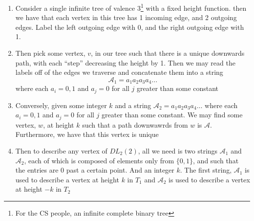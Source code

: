 \begin{enumerate}
    \item Consider a single infinite tree of valence 3\footnote{For the CS people, an infinite complete binary tree} with a fixed height function. then we have that each vertex in this tree has 1 incoming edge, and 2 outgoing edges. Label the left outgoing edge with 0, and the right outgoing edge with 1.
    \item Then pick some vertex, $v$, in our tree such that there is a unique downwards path, with each ``step'' decreasing the height by 1. Then we may read the labels off of the edges we traverse and concatenate them into a string
    \[\mathcal{A}_1 = a_1a_2a_3a_4\ldots\]
    where each $a_i=0,1$ and $a_j=0$ for all $j$ greater than some constant
    \item Conversely, given some integer $k$ and a string $\mathcal{A}_2=a_1a_2a_3a_4\ldots$ where each $a_i=0,1$ and $a_j=0$ for all $j$ greater than some constant. We may find some vertex, $w$, at height $k$ such that a path downwawrds from $w$ is $\mathcal{A}$. Furthermore, we have that this vertex is unique
    \item Then to describe any vertex of $DL_2(2)$, all we need is two strings $\mathcal{A}_1$ and $\mathcal{A}_2$, each of which is composed of elements only from $\{0,1\}$, and such that the entries are 0 past a certain point. And an integer $k$. The first string, $\mathcal{A}_1$ is used to describe a vertex at height $k$ in $T_1$ and $\mathcal{A}_2$ is used to describe a vertex at height $-k$ in $T_2$
\end{enumerate}







